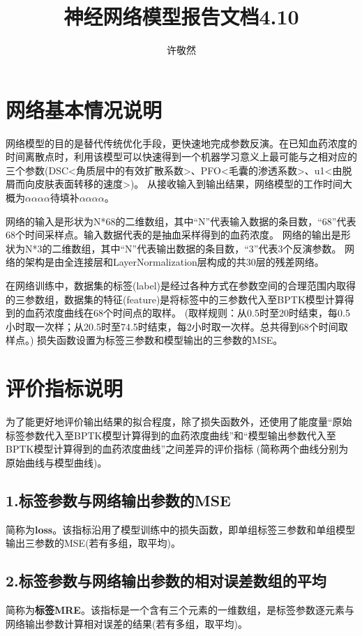 \documentclass{article}
\date{}
\title{神经网络模型报告文档4.10}
\author{许敬然}
\begin{document}
\maketitle

\section*{网络基本情况说明}

网络模型的目的是替代传统优化手段，更快速地完成参数反演。在已知血药浓度的时间离散点时，利用该模型可以快速得到一个机器学习意义上最可能与之相对应的三个参数(DSC<角质层中的有效扩散系数>、PFO<毛囊的渗透系数>、u1<由脱屑而向皮肤表面转移的速度>)。
从接收输入到输出结果，网络模型的工作时间大概为$\alpha \alpha \alpha \alpha \mbox{待填补}\alpha \alpha \alpha \alpha $。

网络的输入是形状为N*68的二维数组，其中“N”代表输入数据的条目数，“68”代表68个时间采样点。输入数据代表的是抽血采样得到的血药浓度。
网络的输出是形状为N*3的二维数组，其中“N”代表输出数据的条目数，“3”代表3个反演参数。
网络的架构是由全连接层和LayerNormalization层构成的共30层的残差网络。

在网络训练中，数据集的标签(label)是经过各种方式在参数空间的合理范围内取得的三参数组，数据集的特征(feature)是将标签中的三参数代入至BPTK模型计算得到的血药浓度曲线在68个时间点的取样。
(取样规则：从0.5时至20时结束，每0.5小时取一次样；从20.5时至74.5时结束，每2小时取一次样。总共得到68个时间取样点。)
损失函数设置为标签三参数和模型输出的三参数的MSE。

\section*{评价指标说明}

为了能更好地评价输出结果的拟合程度，除了损失函数外，还使用了能度量“原始标签参数代入至BPTK模型计算得到的血药浓度曲线”和“模型输出参数代入至BPTK模型计算得到的血药浓度曲线”之间差异的评价指标
(简称两个曲线分别为原始曲线与模型曲线)。
\subsection*{1.标签参数与网络输出参数的MSE}
简称为\textbf{loss}。该指标沿用了模型训练中的损失函数，即单组标签三参数和单组模型输出三参数的MSE(若有多组，取平均)。
\subsection*{2.标签参数与网络输出参数的相对误差数组的平均}
简称为\textbf{标签MRE}。该指标是一个含有三个元素的一维数组，是标签参数逐元素与网络输出参数计算相对误差的结果(若有多组，取平均)。
\end{document}
